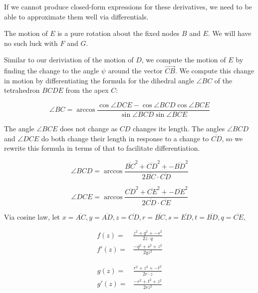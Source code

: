 \documentclass[11pt]{article}
\begin{document}
If we cannot produce closed-form expressions for these derivatives, we need to be able to approximate them well via differentials.

The motion of $E$ is a pure rotation about the fixed nodes $B$ and $E$. We will have no such luck with $F$ and $G$.

Similar to our deriviation of the motion of $D$, we compute the motion of $E$ by finding the change to the angle $\psi$ around the
vector $\overrightarrow{CB}$. We compute this change in motion by differentiating the formula for the dihedral angle $\angle BC$ of
the tetrahedron $BCDE$ from the apex $C$:

\begin{equation}
 \angle BC  =\arccos{\frac{\cos{\angle DCE} - \cos{\angle BCD}\cos{\angle BCE}}{\sin{\angle BCD}\sin{\angle BCE}}}
\end{equation}

The angle $\angle BCE$ does not change as $CD$ changes its length. The angles $\angle BCD$ and $\angle DCE$ do both
change their length in response to a change to $\overline{CD}$, so we rewrite this formula in terms of that to facilitate differentiation.

\begin{equation}
\angle BCD  = \arccos{\frac{\overline{BC}^2 + \overline{CD}^2 + -\overline{BD}^2}{2\overline{BC}\cdot\overline{CD}}}
\end{equation}


\begin{equation}
\angle DCE  = \arccos{\frac{\overline{CD}^2 + \overline{CE}^2 + -\overline{DE}^2}{2\overline{CD}\cdot \overline{CE}}}
\end{equation}


Via cosine law, let $x = \overline{AC}, y = \overline{AD}, z = \overline{CD}, r = \overline{BC}, s = \overline{ED},
t = \overline{BD}, q = \overline{CE},$

\begin{align*}
  f(z) =  & \frac{z^2 + q^2 + -s^2}{2z\cdot q} \\
  f'(z) = & \frac{-q^2 + s^2 + z^2}{2 q z^2}
\end{align*}

\begin{align*}
  g(z) = &  \frac{r^2 + z^2 + -t^2}{2r\cdot z} \\
  g'(z) = & \frac{-r^2 + t^2 + z^2}{2 r z^2}
\end{align*}
\end{document}
